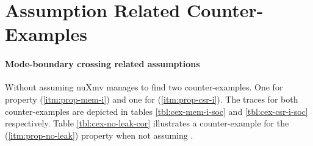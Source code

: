 \section{Assumption Related Counter-Examples}
\label{sec:cexs}


\paragraph{Mode-boundary crossing related assumptions}
Without assuming  nuXmv manages to find two counter-examples.
One for property  (\ref{itm:prop-mem-i}) and one for  (\ref{itm:prop-csr-i}).
The traces for both counter-examples are depicted in tables \ref{tbl:cex-mem-i-soc} and \ref{tbl:cex-csr-i-soc} respectively.
Table \ref{tbl:cex-no-leak-cor} illustrates a counter-example for the  (\ref{itm:prop-no-leak}) property when not assuming .

